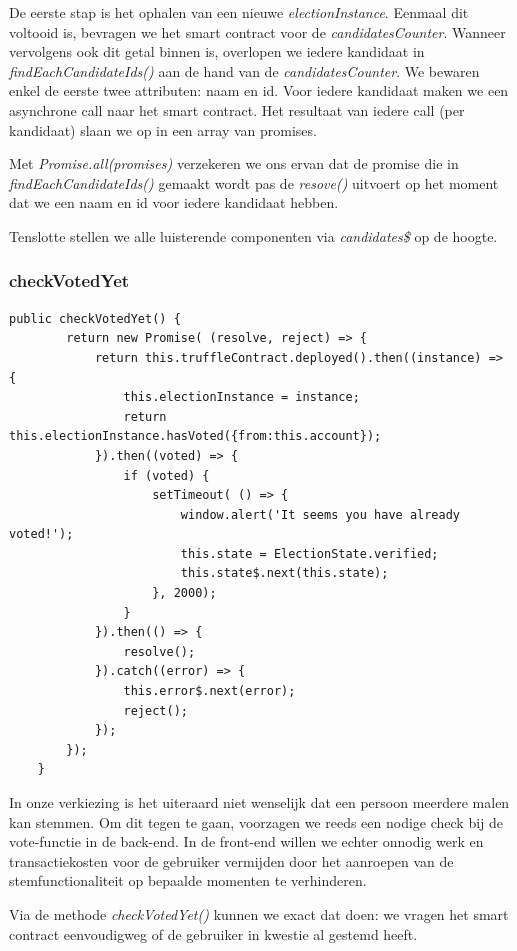 		De eerste stap is het ophalen van een nieuwe \textit{electionInstance}. Eenmaal dit voltooid is, bevragen we het smart contract voor de \textit{candidatesCounter}. Wanneer vervolgens ook dit getal binnen is, overlopen we iedere kandidaat in \textit{findEachCandidateIds()} aan de hand van de \textit{candidatesCounter}. We bewaren enkel de eerste twee attributen:  naam en id. Voor iedere kandidaat maken we een asynchrone call naar het smart contract. Het resultaat van iedere call (per kandidaat) slaan we op in een array van promises.
		
		Met \textit{Promise.all(promises)} verzekeren we ons ervan dat de promise die in \textit{findEachCandidateIds()} gemaakt wordt pas de \textit{resove()} uitvoert op het moment dat we een naam en id voor iedere kandidaat hebben.
		
		Tenslotte stellen we alle luisterende componenten via \textit{candidates\$} op de hoogte. 
	\subsubsection{checkVotedYet}
	\lstset{language=JavaScriptSolidity} 
	\begin{lstlisting}[numbers=none]
	public checkVotedYet() {
		return new Promise( (resolve, reject) => {
			return this.truffleContract.deployed().then((instance) => {
				this.electionInstance = instance;
				return this.electionInstance.hasVoted({from:this.account});
			}).then((voted) => {
				if (voted) {
					setTimeout( () => {
						window.alert('It seems you have already voted!');
						this.state = ElectionState.verified;
						this.state$.next(this.state);
					}, 2000);
				}
			}).then(() => {
				resolve();
			}).catch((error) => {
				this.error$.next(error);
				reject();
			});
		});
	}
	\end{lstlisting}
	In onze verkiezing is het uiteraard niet wenselijk dat een persoon meerdere malen kan stemmen. Om dit tegen te gaan, voorzagen we reeds een nodige check bij de vote-functie in de back-end. In de front-end willen we echter onnodig werk en transactiekosten voor de gebruiker vermijden door het aanroepen van de stemfunctionaliteit op bepaalde momenten te verhinderen. 
	
	Via de methode \textit{checkVotedYet()} kunnen we exact dat doen: we vragen het smart contract eenvoudigweg of de gebruiker in kwestie al gestemd heeft.
